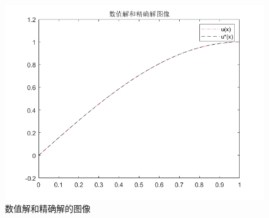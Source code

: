 \documentclass{article}
\begin{document}
\begin{figure}[H]
\centering
\includegraphics[scale=0.5]{中心差分和有限体积法的中矩形公式/solution_2.png}
\caption{\label{solution_image}数值解和精确解的图像}
\end{figure}
\end{document}
